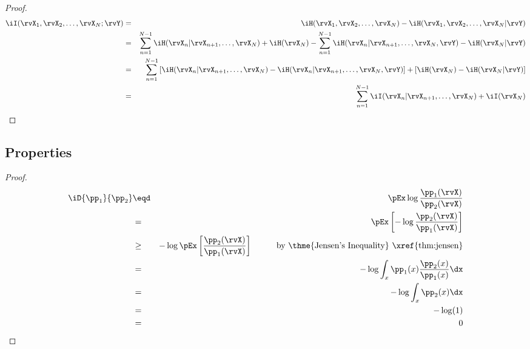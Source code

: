 \begin{theorem}
\end{theorem}
\begin{proof}
\begin{eqnarray*}
  \iI(\rvX_1,\rvX_2,\ldots,\rvX_N;\rvY)
    &=& \iH(\rvX_1,\rvX_2,\ldots,\rvX_N) - \iH(\rvX_1,\rvX_2,\ldots,\rvX_N|\rvY)
  \\&=& \sum_{n=1}^{N-1}\iH(\rvX_n|\rvX_{n+1},\ldots,\rvX_N) + \iH(\rvX_N) 
        - \sum_{n=1}^{N-1}\iH(\rvX_n|\rvX_{n+1},\ldots,\rvX_N,\rvY) - \iH(\rvX_N|\rvY) 
  \\&=& \sum_{n=1}^{N-1}\left[ 
        \iH(\rvX_n|\rvX_{n+1},\ldots,\rvX_N) - \iH(\rvX_n|\rvX_{n+1},\ldots,\rvX_N,\rvY) 
        \right]
        + \left[ \iH(\rvX_N) - \iH(\rvX_N|\rvY) \right]
  \\&=& \sum_{n=1}^{N-1}\iI(\rvX_n|\rvX_{n+1},\ldots,\rvX_N) 
        + \iI(\rvX_N) 
\end{eqnarray*}
\end{proof}

\subsection{Properties}
\begin{theorem}
\end{theorem}
\begin{proof}
\begin{eqnarray*}
  \iD{\pp_1}{\pp_2}
    &\eqd& \pEx\log\frac{\pp_1(\rvX)}{\pp_2(\rvX)}
  \\&=&    \pEx\left[-\log\frac{\pp_2(\rvX)}{\pp_1(\rvX)} \right]
  \\&\ge&  -\log\pEx\left[\frac{\pp_2(\rvX)}{\pp_1(\rvX)} \right]
    \hspace{1cm}\mbox{by \thme{Jensen's Inequality} \xref{thm:jensen}}
  \\&=&    -\log\int_x \pp_1(x)\frac{\pp_2(x)}{\pp_1(x)} \dx
  \\&=&    -\log\int_x \pp_2(x) \dx
  \\&=&    -\log(1)
  \\&=&    0
\end{eqnarray*}
\end{proof}
